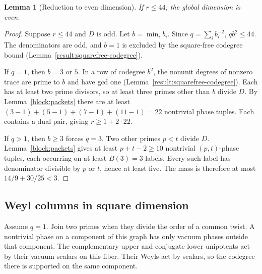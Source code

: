 \documentclass[11pt]{amsart}
\numberwithin{equation}{section}
\newtheorem{lemma}[theorem]{Lemma}
\theoremstyle{definition}
\theoremstyle{plain}
\begin{document}
\begin{lemma}[Reduction to even dimension]\label{general:odd-small}
If $r\le44$, the global dimension is even.
\end{lemma}
\begin{proof}
Suppose $r\le44$ and $D$ is odd. Let $b=\min_i b_i$. Since $q=\sum_i b_i^{-2}$,
$qb^2\le44$. The denominators are odd, and $b=1$ is excluded by the
square-free codegree bound (Lemma~\ref{result:squarefree-codegree}).

If $q=1$, then $b=3$ or $5$. In a row of codegree $b^2$, the nonunit
degrees of nonzero trace are prime to $b$ and have gcd one
(Lemma~\ref{result:squarefree-codegree}). Each has at least two prime divisors, so
at least three primes other than $b$ divide $D$. By
Lemma~\ref{block:packets} there are at least
$(3-1)+(5-1)+(7-1)+(11-1)=22$ nontrivial phase tuples.
Each contains a dual pair, giving $r\ge1+2\cdot22$.

If $q>1$, then $b\ge3$ forces $q=3$. Two other primes $p<t$ divide
$D$. Lemma~\ref{block:packets} gives at least $p+t-2\ge10$ nontrivial
$(p,t)$-phase tuples, each occurring on at least $B(3)=3$ labels.
Every such label has denominator divisible by $p$ or $t$, hence at
least five. The mass is therefore at most $14/9+30/25<3$.
\end{proof}

\subsection{Weyl columns in square dimension}
Assume $q=1$. Join two primes when they divide the order of a common twist.
A nontrivial phase on a component of this graph has only
vacuum phases outside that component. The complementary upper and
conjugate lower unipotents act by their vacuum scalars on this
fiber. Their Weyls act by scalars, so the codegree there is
supported on the same component.
\end{document}
